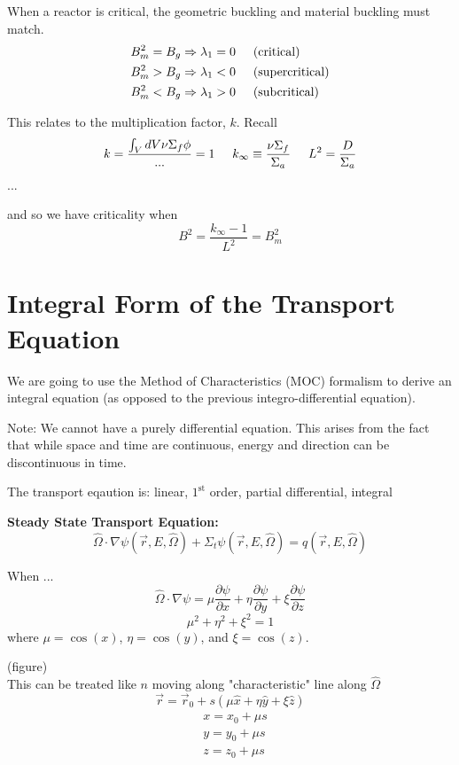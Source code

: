 \documentclass{report}
\newcommand{\h}[1]{\section*{#1}}
\newcommand{\p}{\partial}
\newcommand{\Xs}{\Sigma}
\newcommand{\pos}{\vec{r}}
\newcommand{\Oh}{\hat{\Omega}}
\newcommand{\rEO}{(\pos,E,\Oh)}
\begin{document}
When a reactor is critical, the geometric buckling and material buckling must match.
\begin{align*}
& B_m^2 = B_g \Rightarrow \lambda_1 = 0 \hspace{0.5cm} \text{(critical)} \\
& B_m^2 > B_g \Rightarrow \lambda_1 < 0 \hspace{0.5cm} \text{(supercritical)} \\
& B_m^2 < B_g \Rightarrow \lambda_1 > 0 \hspace{0.5cm} \text{(subcritical)} 
\end{align*}

This relates to the multiplication factor, $k$. Recall
$$ k = \frac{\int_V dV \nu\Xs_f\phi}{...} = 1 \hspace{0.5cm} k_{\infty} \equiv \frac{\nu\Xs_f}{\Xs_a} \hspace{0.5cm} L^2 = \frac{D}{\Xs_a} $$
...

and so we have criticality when 
$$ B^2 = \frac{k_{\infty}-1}{L^2} = B_m^2 $$



\h{Integral Form of the Transport Equation}

We are going to use the Method of Characteristics (MOC) formalism to derive an integral equation (as opposed to the previous integro-differential equation).

Note: We cannot have a purely differential equation. This arises from the fact that while space and time are continuous,  energy and direction can be discontinuous in time.

The transport eqaution is: linear, $1^{\text{st}}$ order, partial differential, integral

\textbf{Steady State Transport Equation:}
$$ \Oh\cdot\nabla\psi\rEO + \Xs_t \psi\rEO = q\rEO $$

When ...
$$ \Oh\cdot\nabla\psi = \mu \frac{\p\psi}{\p x} + \eta \frac{\p\psi}{\p y} + \xi \frac{\p\psi}{\p z} $$
$$ \mu^2 + \eta^2 + \xi^2 = 1 $$
where $\mu = \cos(x)$, $\eta = \cos(y)$, and $\xi = \cos(z)$.

(figure)\\

This can be treated like $n$ moving along "characteristic" line along $\Oh$
$$ \pos = \pos_0 + s(\mu\hat{x} + \eta\hat{y} + \xi\hat{z}) $$
\begin{align*}
& x = x_0 + \mu s \\
& y = y_0 + \mu s \\
& z = z_0 + \mu s \\
\end{align*}
\end{document}
